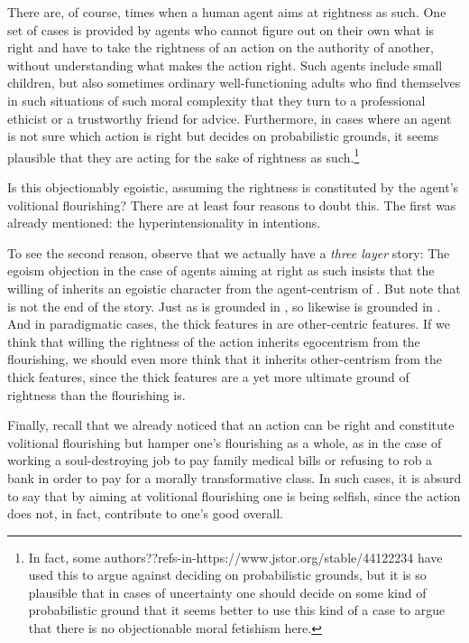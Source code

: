 There are, of course, times when a human agent aims at rightness as such. One set of cases is provided by agents who cannot
figure out on their own what is right and have to take the rightness of an action on the authority of another, without
understanding what makes the action right. Such agents include small children, but also sometimes ordinary well-functioning
adults who find themselves in such situations of such moral complexity that they turn to a professional ethicist or a 
trustworthy friend for advice. Furthermore, in cases where an agent is not sure which action is right but decides on
probabilistic grounds, it seems plausible that they are acting for the sake of rightness as such.\footnote{In fact, some
authors??refs-in-https://www.jstor.org/stable/44122234 have used this to argue against deciding on probabilistic grounds,
but it is  so plausible that in cases of uncertainty one should decide on some kind of probabilistic ground that it seems
better to use this kind of a case to argue that there is no objectionable moral fetishism here.}

Is this objectionably egoistic, assuming the rightness is constituted by the agent's volitional
flourishing? There are at least four reasons to doubt this. The first was already mentioned: the hyperintensionality in 
intentions.

To see the second reason, observe that we actually have a \textit{three layer} story:
The egoism objection in the case of agents aiming at right as such insists that the willing of  inherits 
an egoistic character from the agent-centrism of . But note that  is not the end of the story. Just as 
 is grounded in 
, so likewise  is grounded in . And in paradigmatic cases, the thick features in  
are other-centric features. If we think that willing the rightness of the action inherits egocentrism from the flourishing, we should even more 
think that it inherits  other-centrism from the thick features, since the thick features are a yet more ultimate ground of rightness
than the flourishing is.

Finally, recall that we already noticed that an action can be right and constitute volitional flourishing but hamper one's flourishing as 
a whole, as in the case of working a soul-destroying job to pay family medical bills or refusing to rob a bank in order to pay for a 
morally transformative class. In such cases, it is absurd to say that by aiming at volitional flourishing one is being selfish, since the
action does not, in fact, contribute to one's good overall.

